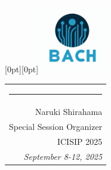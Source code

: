 \documentclass[landscape]{article}
\begin{document}
\begin{center}
    \vspace{1cm}
    \begin{minipage}{0.8\textwidth}
        \raisebox{-1cm}[0pt][0pt]{\hspace{3cm}\includegraphics[height=3cm]{logo.png}}
        \hspace{-3cm}\hfill\begin{tabular}{r}
            \rule{5cm}{0.4pt}         \\
            Naruki Shirahama          \\
            Special Session Organizer \\
            ICISIP 2025               \\[0.5cm]
            {\itshape September 8-12, 2025}
        \end{tabular}
        \hspace{1cm}
    \end{minipage}
\end{center}
\end{document}
